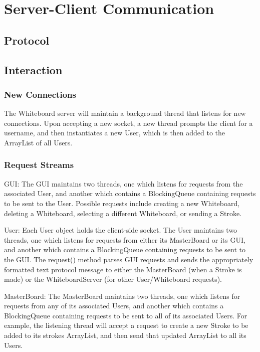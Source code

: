 \section{Server-Client Communication}

\subsection{Protocol}

\subsection{Interaction}

\subsubsection{New Connections}

The Whiteboard server will maintain a background thread that listens for new connections. Upon accepting a new socket, a new thread prompts the client for a username, and then instantiates a new User, which is then added to the ArrayList of all Users.

\subsubsection{Request Streams}

GUI: The GUI maintains two threads, one which listens for requests from the associated User, and another which contains a BlockingQueue containing requests to be sent to the User. Possible requests include creating a new Whiteboard, deleting a Whiteboard, selecting a different Whiteboard, or sending a Stroke.

User: Each User object holds the client-side socket. The User maintains two threads, one which listens for requests from either its MasterBoard or its GUI, and another which contains a BlockingQueue containing requests to be sent to the GUI. The request() method parses GUI requests and sends the appropriately formatted text protocol message to either the MasterBoard (when a Stroke is made) or the WhiteboardServer (for other User/Whiteboard requests).

MasterBoard: The MasterBoard maintains two threads, one which listens for requests from any of its associated Users, and another which contains a BlockingQueue containing requests to be sent to all of its associated Users. For example, the listening thread will accept a request to create a new Stroke to be added to its strokes ArrayList, and then send that updated ArrayList to all its Users.

